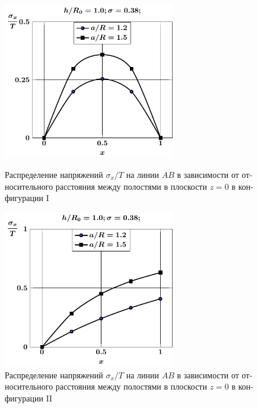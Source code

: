 \begin{russian}
\begin{figure}
\centering\footnotesize
\parbox[b]{7.5cm}{\centering\includegraphics[width=7.5cm]{cav2-a-h10-r10-z0-sig_x.pdf}
\caption{Распределение напряжений $\sigma_x/T$ на линии $AB$ в зависимости от относительного расстояния между полостями в плоскости $z=0$ в конфигурации I
\label{f:7:83}}}\hfil\hfil
\parbox[b]{7.5cm}{\centering\includegraphics[width=7.5cm]{cav2a-a-h10-r10-z0-sig_x.pdf}
\caption{Распределение напряжений $\sigma_x/T$ на линии $AB$ в зависимости от относительного расстояния между полостями в плоскости $z=0$ в конфигурации II
\label{f:7:84}}}
\end{figure}


\end{russian}
